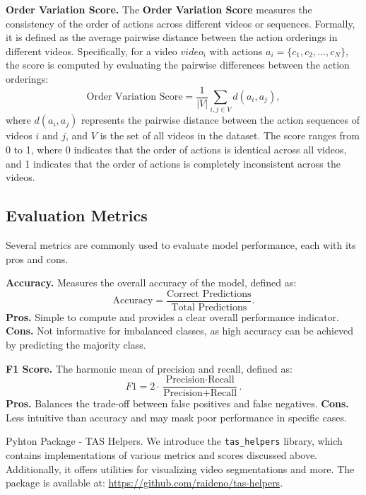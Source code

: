 \noindent\textbf{Order Variation Score.}  
The \textbf{Order Variation Score} measures the consistency of the order of actions across different videos or sequences. Formally, it is defined as the average pairwise distance between the action orderings in different videos. Specifically, for a video $video_i$ with actions $a_i = \{c_1, c_2, \dots, c_N\}$, the score is computed by evaluating the pairwise differences between the action orderings:
$$
\text{Order Variation Score} = \frac{1}{|V|} \sum_{i,j \in V} d(a_i, a_j),
$$
where $d(a_i, a_j)$ represents the pairwise distance between the action sequences of videos $i$ and $j$, and $V$ is the set of all videos in the dataset. The score ranges from 0 to 1, where 0 indicates that the order of actions is identical across all videos, and 1 indicates that the order of actions is completely inconsistent across the videos.

\subsection{Evaluation Metrics}

Several metrics are commonly used to evaluate model performance, each with its pros and cons. 

\noindent\textbf{Accuracy.} Measures the overall accuracy of the model, defined as:
$$
\text{Accuracy} = \frac{\text{Correct Predictions}}{\text{Total Predictions}}.
$$
\noindent\textbf{\small{Pros.}} Simple to compute and provides a clear overall performance indicator. \textbf{\small{Cons.}} Not informative for imbalanced classes, as high accuracy can be achieved by predicting the majority class.

\noindent\textbf{F1 Score.} The harmonic mean of precision and recall, defined as:
$$
F1 = 2 \cdot \frac{\text{Precision} \cdot \text{Recall}}{\text{Precision} + \text{Recall}}.
$$
\noindent\textbf{\small{Pros.}} Balances the trade-off between false positives and false negatives. \textbf{\small{Cons.}} Less intuitive than accuracy and may mask poor performance in specific cases.

\begin{AIbox}{Pyhton Package - TAS Helpers.}
    We introduce the \texttt{tas\_helpers} library, which contains implementations of various metrics and scores discussed above. Additionally, it offers utilities for visualizing video segmentations and more. The package is available at: \url{https://github.com/raideno/tas-helpers}.
\end{AIbox}
